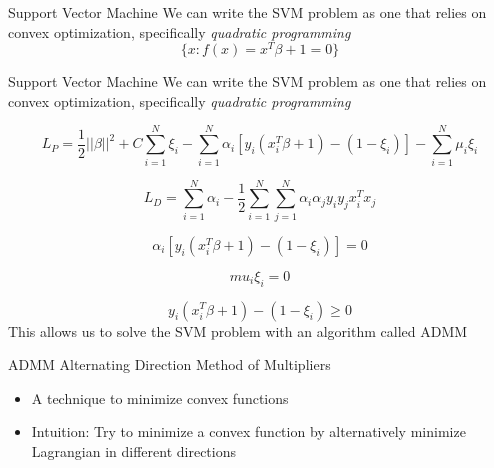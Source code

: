 \documentclass[10pt]{beamer}
\begin{document}
\begin{frame}[fragile]{Support Vector Machine}
We can write the SVM problem as one that relies on convex optimization, specifically \textit{quadratic programming}
\begin{equation}
\{ x: f(x) = x^T\beta + 1 = 0 \}
\end{equation}
\end{frame}

\begin{frame}[fragile]{Support Vector Machine}
We can write the SVM problem as one that relies on convex optimization, specifically \textit{quadratic programming} \cite{stat}

\begin{equation}
L_P = \frac{1}{2}||\beta||^2 + C \sum_{i=1}^{N} \xi_i - \sum_{i=1}^{N}
 \alpha_i \left[ y_i \left( x_i ^T \beta +1 \right) - (1-\xi_i)\right] - \sum_{i=1}^{N} \mu_i \xi_i
\end{equation}

\begin{equation}
L_D = \sum_{i=1}^{N} \alpha_i - \frac{1}{2}\sum_{i=1}^{N} \sum_{j=1}^{N} \alpha_i \alpha_j y_i y_j x_i^T x_j
\end{equation}

\begin{equation}
\alpha_i [y_i (x_i^T \beta + 1) - (1-\xi_i)] = 0
\end{equation}

\begin{equation}
mu_i\xi_i = 0
\end{equation}

\begin{equation}
y_i(x_i^T\beta + 1) - (1-\xi_i) \geq 0
\end{equation}
This allows us to solve the SVM problem with an algorithm called ADMM
\end{frame}


\begin{frame}[fragile]{ADMM}
Alternating Direction Method of Multipliers
 \begin{itemize}

\item A technique to minimize convex functions
\item Intuition: Try to minimize a convex function by alternatively minimize Lagrangian in different directions 
\end{itemize}
\end{frame}
\end{document}
